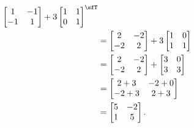 \begin{questions}
\begin{solution}
\begin{align*}
\begin{bmatrix}
          1&-1\\
          -1&1
        \end{bmatrix}
       +3\begin{bmatrix}
         1&1\\
         0&1
       \end{bmatrix}^\sfT\\%
      &=
        \begin{bmatrix}
          2&-2\\
          -2&2
        \end{bmatrix}
      +3\begin{bmatrix}
        1&0\\
        1&1
      \end{bmatrix}\\
      &=\begin{bmatrix}
          2&-2\\
          -2&2
        \end{bmatrix}
      +\begin{bmatrix}
        3&0\\
        3&3
      \end{bmatrix}\\
      &=\begin{bmatrix}
        2+3&-2+0\\
        -2+3&2+3
      \end{bmatrix}\\
      &=\begin{bmatrix}
        5&-2\\
        1&5
      \end{bmatrix}.
    \end{align*}
  \end{solution}
\end{questions}

